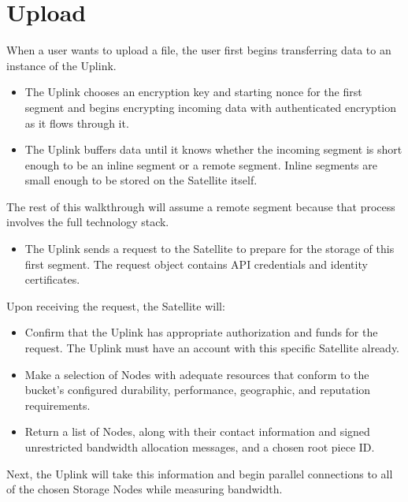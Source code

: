 \documentclass[8pt,fleqn,openany]{book}
\begin{document}
\section{Upload}

When a user wants to upload a file, the user first begins transferring data to
an instance of the Uplink.

\begin{itemize}
\item The Uplink chooses an encryption key and starting nonce for
  the first segment and begins encrypting incoming data with authenticated
  encryption as it flows through it.
\item The Uplink buffers data until it knows whether the incoming segment is
short enough to be an inline segment or a remote segment. Inline segments are
small enough to be stored on the Satellite itself.
\end{itemize}

The rest of this
walkthrough will assume a remote segment because that process involves the
full technology stack.
\begin{itemize}
    \item The Uplink sends a request to the Satellite to prepare for the storage
of this first segment. The request object contains API credentials and identity
certificates.
\end{itemize}

Upon receiving the request, the Satellite will:
\begin{itemize}
\item Confirm that the Uplink has appropriate authorization and funds for
  the request. The Uplink must have an account with this specific Satellite
  already.
\item Make a selection of Nodes with adequate resources that conform to the
  bucket's configured durability, performance, geographic, and reputation
  requirements.
\item Return a list of Nodes, along with their contact information and
  signed unrestricted bandwidth allocation messages, and a chosen root piece
  ID.
\end{itemize}

Next, the Uplink will take this information and begin parallel connections to
  all of the chosen Storage Nodes while measuring bandwidth.
\end{document}
